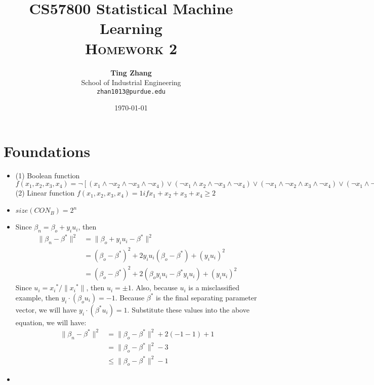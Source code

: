 \documentclass[11pt]{article}
\title{
\textbf{CS57800 Statistical Machine Learning} \\ \textsc{Homework 2} \\
\normalsize\vspace{0.1in}
}
\author{
	\textbf{Ting Zhang} \\
	School of Industrial Engineering\\
	\texttt{zhan1013@purdue.edu}
}
\date{\today}
\begin{document}
\maketitle

\section{Foundations}
\begin{itemize}
\item[1.]
(1) Boolean function \\
\(f(x_1,x_2,x_3,x_4)=\neg[(x_1\wedge \neg x_2\wedge \neg x_3\wedge\neg x_4)\vee
                     (\neg x_1\wedge  x_2\wedge \neg x_3\wedge\neg x_4)\vee
										 (\neg x_1\wedge \neg x_2\wedge  x_3\wedge\neg x_4)\vee
										 (\neg x_1\wedge \neg x_2\wedge \neg x_3\wedge x_4)\vee
										 (\neg x_1\wedge \neg x_2\wedge \neg x_3\wedge \neg x_4)] \) \\
(2) Linear function
\(f(x_1,x_2,x_3,x_4)=1 if x_1+x_2+x_3+x_4 \geq 2\)
\item[2.]
\(size(CON_B)=2^n \)
\item[3.]
Since \(\beta_n = \beta_o+y_i u_i \), then
\begin{align*}
\|\beta_n-\beta^*\|^2 &=\|\beta_o+y_i u_i-\beta^*\|^2 \\
                      &=(\beta_o-\beta^*)^2+2y_i u_i(\beta_o-\beta^*)+(y_i u_i)^2 \\
											&=(\beta_o-\beta^*)^2+2(\beta_o y_i u_i-\beta^*y_i u_i)+(y_i u_i)^2
\end{align*}
Since \(u_i={x_i}^*/\|{x_i}^*\|\), then \(u_i=\pm 1\). Also, because \(u_i\) is a misclassified example, then \(y_i \cdot (\beta_o u_i)=-1\). Because \(\beta^*\) is the final separating parameter vector, we will have \(y_i \cdot (\beta^* u_i)=1\). Substitute these values into the above equation, we will have:
\begin{align*}
\|\beta_n-\beta^*\|^2 &=\|\beta_o-\beta^*\|^2+2(-1-1)+1 \\
                      &=\|\beta_o-\beta^*\|^2-3 \\
											& \leq \|\beta_o-\beta^*\|^2-1
\end{align*}
\item[4.]


\end{itemize}
\end{document}
